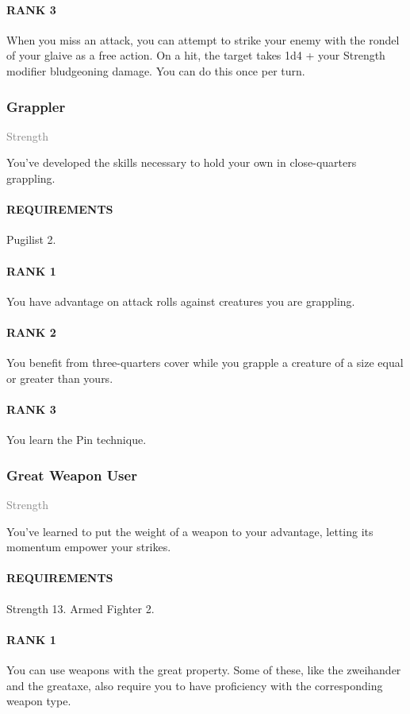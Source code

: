 \paragraph{RANK 3} When you miss an attack, you can attempt to strike your enemy with the rondel of your glaive as a free action.
On a hit, the target takes 1d4 + your Strength modifier bludgeoning damage.
You can do this once per turn.

\subsubsection{Grappler} \label{tal::grappler}
\small{\textcolor{gray}{Strength}}

\normalsize
You've developed the skills necessary to hold your own in close-quarters grappling.
\paragraph{REQUIREMENTS} Pugilist 2.
\paragraph{RANK 1} You have advantage on attack rolls against creatures you are grappling.
\paragraph{RANK 2} You benefit from three-quarters cover while you grapple a creature of a size equal or greater than yours.
\paragraph{RANK 3} You learn the Pin technique.

\subsubsection{Great Weapon User} \label{tal::greatweaponuser}
\small{\textcolor{gray}{Strength}}

\normalsize
You've learned to put the weight of a weapon to your advantage, letting its momentum empower your strikes.
\paragraph{REQUIREMENTS} Strength 13. Armed Fighter 2.
\paragraph{RANK 1} You can use weapons with the great property.
Some of these, like the zweihander and the greataxe, also require you to have proficiency with the corresponding weapon type.
